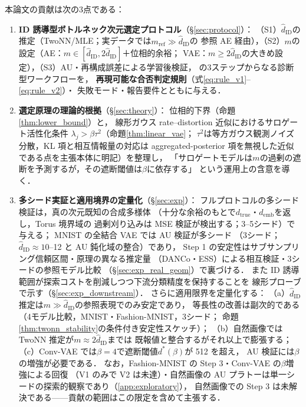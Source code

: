 \documentclass[11pt,a4paper]{jsarticle}
\newcommand{\hatdID}{\hat{d}_{\mathrm{ID}}}
\newcommand{\dtrue}{d_{\mathrm{true}}}
\newcommand{\demb}{d_{\mathrm{emb}}}
\newcommand{\dstar}{d^{*}(\beta)}
\begin{document}
本論文の貢献は次の3点である：
\begin{enumerate}
  \item \textbf{ID 誘導型ボトルネック次元選定プロトコル}（§\ref{sec:protocol}）：
        （S1）$\hatdID$の推定（TwoNN/MLE；実データでは$m_{\mathrm{ref}} \gg \hatdID$の
        参照 AE 経由），（S2）$m$の設定（AE：$m \in [\hatdID, 2\hatdID]$＋位相的余裕；
        VAE：$m \geq 2\hatdID$の大きめ設定），（S3）AU・再構成誤差による学習後検証，
        の3ステップからなる診断型ワークフローを，
        \textbf{再現可能な合否判定規則}（式\eqref{eq:rule_v1}--\eqref{eq:rule_v2}）・
        失敗モード・報告要件とともに与える．
  \item \textbf{選定原理の理論的根拠}（§\ref{sec:theory}）：
        位相的下界（命題\ref{thm:lower_bound}）と，
        線形ガウス rate--distortion 近似におけるサロゲート活性化条件
        $\lambda_j > \beta\tau^2$（命題\ref{thm:linear_vae}；
        $\tau^2$は等方ガウス観測ノイズ分散，KL 項と相互情報量の対応は
        aggregated-posterior 項を無視した近似である点を主張本体に明記）を整理し，
        「サロゲートモデルは$m$の過剰の遮断を予測するが，その遮断閾値は$\beta$に依存する」
        という運用上の含意を導く．
  \item \textbf{多シード実証と適用境界の定量化}（§\ref{sec:exp}）：
        フルプロトコルの多シード検証は，真の次元既知の合成多様体
        （十分な余裕のもとで$\dtrue$・$\demb$を返し，Torus 境界域の
        過剰刈り込みは MSE 検証が検出する；3--5シード）で与える；
        MNIST の全結合 VAE では AU 検証が多シード
        （3シード；$\hatdID \approx 10$--12 と AU 鈍化域の整合）であり，
        Step 1 の安定性はサブサンプリング信頼区間・原理の異なる推定量
        （DANCo・ESS）による相互検証・3シードの参照モデル比較
        （§\ref{sec:exp_real_geom}）で裏づける．
        また ID 誘導範囲が探索コストを削減しつつ下流分類精度を保持することを
        線形プローブで示す（§\ref{sec:exp_downstream}）．
        さらに適用限界を定量化する：
        （a）$\hatdID$推定は$m \gg \hatdID$の参照表現でのみ安定であり，
        等長性の改善は副次的である（4モデル比較，MNIST・Fashion-MNIST，3シード；
        命題\ref{thm:twonn_stability}の条件付き安定性スケッチ）；
        （b）自然画像では TwoNN 推定が$m \approx 2\hatdID$までは
        既報値\cite{pope2021intrinsic}と整合するがそれ以上で膨張する；
        （c）Conv-VAE では$\beta = 4$で遮断閾値$\dstar$が 512 を超え，
        AU 検証には$\beta$の増強が必要である．
        なお，Fashion-MNIST の Step 3・Conv-VAE の$\beta$増強による回復
        （V1 のみで V2 は未達）・自然画像の
        AU プラトーは単一シードの探索的観察であり（\ref{app:exploratory}），
        自然画像での Step 3 は未解決である——貢献の範囲はこの限定を含めて主張する．
\end{enumerate}
\end{document}
